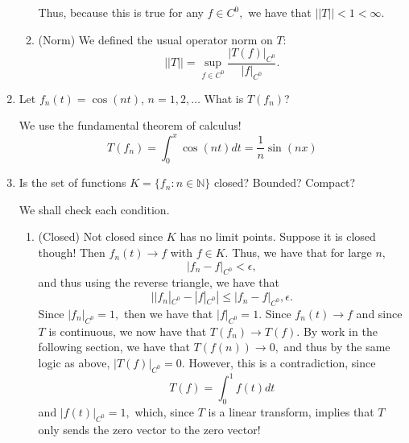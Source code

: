 \documentclass[11pt]{article}
\newcommand{\bbN}{\mathbb{N}}
\begin{document}
\begin{enumerate}
\begin{solution}
\begin{enumerate}
            Thus, because this is true for any $f\in C^0,$ we have that $||T||< 1 < \infty.$
            \item (Norm) We defined the usual operator norm on $T:$
            \[||T|| = \sup_{f\in C^0}\frac{|T(f)|_{C^0}}{|f|_{C^0}}.\]
        \end{enumerate}
    \end{solution}
    \item  Let $f_n(t) = \cos(nt)$, $n=1,2, \dots$ What is $T(f_n)$?
    \begin{solution}
        We use the fundamental theorem of calculus!
        \[T(f_n) = \int_0^x \cos(nt)dt = \frac{1}{n}
        \sin(nx)\]
    \end{solution}
    \item  Is the set of functions $K = \{f_n : n \in \bbN\}$ closed? Bounded? Compact?
    \begin{solution} We shall check each condition.
        \begin{enumerate}
            \item (Closed) Not closed since $K$ has no limit points. Suppose it is closed though! Then $f_n(t) \to f$ with $f \in K.$ Thus, we have that for large $n,$ 
            \[|f_n - f|_{C^0}< \epsilon,\] and thus using the reverse triangle, we have that 
            \[||f_n|_{C^0} - |f|_{C^0}|\leq |f_n - f|_{C^0} , \epsilon.\] Since $|f_n|_{C^0} = 1,$ then we have that $|f|_{C^0} = 1.$ Since $f_n(t) \to f$ and since $T$ is continuous, we now have that $T(f_n) \to T(f).$ By work in the following section, we have that $T(f(n))\to 0,$ and thus by the same logic as above, $|T(f)|_{C^0} = 0.$ However, this is a contradiction, since 
            \[T(f) = \int_0^1 f(t)dt\] and $|f(t)|_{C^0} = 1,$ which, since $T$ is a linear transform, implies that $T$ only sends the zero vector to the zero vector!


\end{enumerate}
\end{solution}
\end{enumerate}
\end{document}
